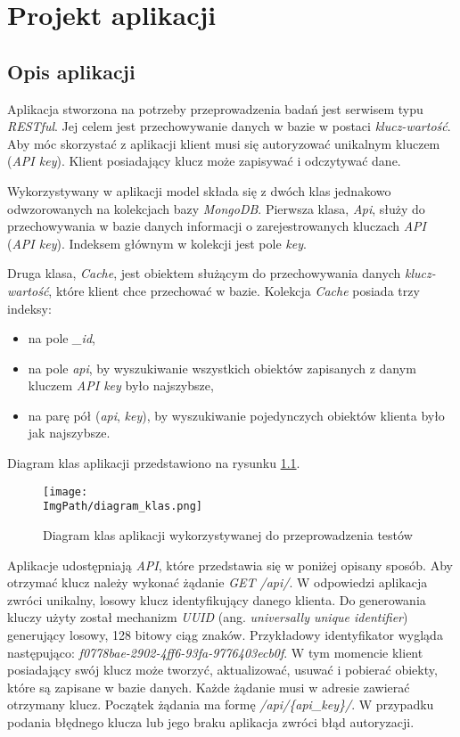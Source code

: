 \chapter{Projekt aplikacji}
\section{Opis aplikacji}
Aplikacja stworzona na potrzeby przeprowadzenia badań jest serwisem typu \textsl{RESTful}. Jej celem jest przechowywanie danych w bazie w postaci \textsl{klucz-wartość}. Aby móc skorzystać z aplikacji klient musi się autoryzować unikalnym kluczem (\textsl{API key}). Klient posiadający klucz może zapisywać i odczytywać dane. 

Wykorzystywany w aplikacji model składa się z dwóch klas jednakowo odwzorowanych na kolekcjach bazy \textsl{MongoDB}. Pierwsza klasa, \textsl{Api}, służy do przechowywania w bazie danych informacji o zarejestrowanych kluczach \textsl{API} (\textsl{API key}). Indeksem głównym w kolekcji jest pole \textsl{key}.

Druga klasa, \textsl{Cache}, jest obiektem służącym do przechowywania danych \textsl{klucz-wartość}, które klient chce przechować w bazie.
Kolekcja \textsl{Cache} posiada trzy indeksy:\begin{itemize}
    \item na pole \textsl{\_id},
    \item na pole \textsl{api}, by wyszukiwanie wszystkich obiektów zapisanych z danym kluczem \textsl{API key} było najszybsze,
    \item na parę pół (\textsl{api}, \textsl{key}), by wyszukiwanie pojedynczych obiektów klienta było jak najszybsze.\end{itemize}
Diagram klas aplikacji przedstawiono na  rysunku \ref{fig:class_diagram}. 
\begin{figure}[!ht]
\centering
\texttt{[image: \\ImgPath/diagram\_klas.png]}
\caption{Diagram klas aplikacji wykorzystywanej do przeprowadzenia testów}
\label{fig:class_diagram}
\end{figure}

Aplikacje udostępniają \textsl{API}, które przedstawia się w poniżej opisany sposób. Aby otrzymać klucz należy wykonać żądanie \textsl{GET /api/}. W odpowiedzi aplikacja zwróci unikalny, losowy klucz identyfikujący danego klienta. Do generowania kluczy użyty został mechanizm \textsl{UUID} (ang. \textsl{universally unique identifier}) generujący losowy, 128 bitowy ciąg znaków. Przykładowy identyfikator wygląda następująco: \textsl{f0778bae-2902-4ff6-93fa-9776403ecb0f}. W tym momencie klient posiadający swój klucz może tworzyć, aktualizować, usuwać i pobierać obiekty, które są zapisane w bazie danych. Każde żądanie  musi w adresie zawierać otrzymany klucz. Początek żądania ma formę \textsl{/api/\{api\_key\}/}. W przypadku podania błędnego klucza lub jego braku aplikacja zwróci błąd autoryzacji. 
 


